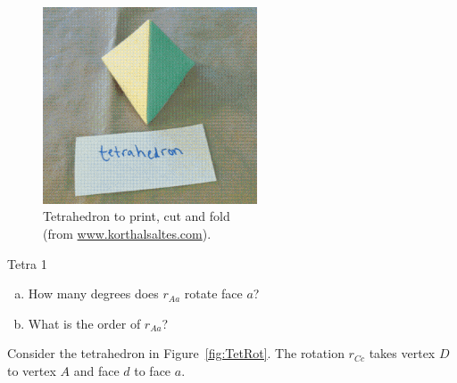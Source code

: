 \begin{figure}[ht]
\begin{center}
\includegraphics[width=2.5in]{images/TetrahedronFold.png}
\caption[caption]{Tetrahedron to print, cut and fold 
\\ \hspace{\textwidth} 
(from \url{www.korthalsaltes.com}).}
 \label{fig:TetraFold}
\end{center}
\end{figure}

\begin{exercise}{Tetra 1}
\begin{enumerate}[(a)]
\item How many degrees does $ r_{Aa}$ rotate face $a$?
\item What is the order of $r_{Aa}$?
\end{enumerate}

\end{exercise}
Consider the tetrahedron in Figure~\ref{fig:TetRot}.  The rotation $r_{Cc}$ takes vertex $D$ to vertex $A$ and face $d$ to face $a$.  

